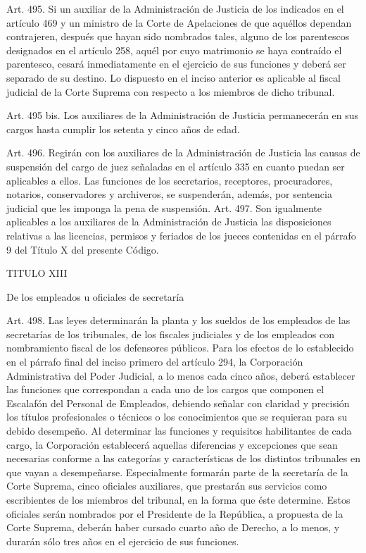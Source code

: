     Art. 495. Si un auxiliar de la Administración de Justicia de los indicados en el artículo 469 y un ministro de la Corte de Apelaciones de que aquéllos dependan contrajeren, después que hayan sido nombrados tales, alguno de los parentescos designados en el artículo 258, aquél por cuyo matrimonio se haya contraído el parentesco, cesará inmediatamente en el ejercicio de sus funciones y deberá ser separado de su destino.
    Lo dispuesto en el inciso anterior es aplicable al fiscal judicial de la Corte Suprema con respecto a los miembros de dicho tribunal.

    Art. 495 bis. Los auxiliares de la Administración de Justicia permanecerán en sus cargos hasta cumplir los setenta y cinco años de edad.

    Art. 496. Regirán con los auxiliares de la Administración de Justicia las causas de suspensión del cargo de juez señaladas en el artículo 335 en cuanto puedan ser aplicables a ellos.
    Las funciones de los secretarios, receptores, procuradores, notarios, conservadores y archiveros, se suspenderán, además, por sentencia judicial que les imponga la pena de suspensión.
    Art. 497. Son igualmente aplicables a los auxiliares de la Administración de Justicia las disposiciones relativas a las licencias, permisos y feriados de los jueces contenidas en el párrafo 9 del Título X del presente Código.


    TITULO XIII

    De los empleados u oficiales de secretaría






    Art. 498. Las leyes determinarán la planta y los sueldos de los empleados de las secretarías de los tribunales, de los fiscales judiciales y de los empleados con nombramiento fiscal de los defensores públicos.
    Para los efectos de lo establecido en el párrafo final del inciso primero del artículo 294, la Corporación Administrativa del Poder Judicial, a lo menos cada cinco años, deberá establecer las funciones que correspondan a cada uno de los cargos que componen el Escalafón del Personal de Empleados, debiendo señalar con claridad y precisión los títulos profesionales o técnicos o los conocimientos que se requieran para su debido desempeño. Al determinar las funciones y requisitos habilitantes de cada cargo, la Corporación establecerá aquellas diferencias y excepciones que sean necesarias conforme a las categorías y características de los distintos tribunales en que vayan a desempeñarse.
    Especialmente formarán parte de la secretaría de la Corte Suprema, cinco oficiales auxiliares, que prestarán sus servicios como escribientes de los miembros del tribunal, en la forma que éste determine. Estos oficiales serán nombrados por el Presidente de la República, a propuesta de la Corte Suprema, deberán haber cursado cuarto año de Derecho, a lo menos, y durarán sólo tres años en el ejercicio de sus funciones.



